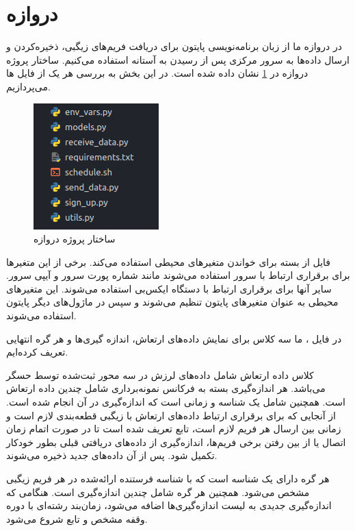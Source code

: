 \section{دروازه}

در دروازه ما از زبان برنامه‌نویسی پایتون برای دریافت فریم‌های زیگبی، ذخیره‌کردن و ارسال داده‌ها به سرور مرکزی پس از رسیدن به آستانه استفاده می‌کنیم. ساختار پروژه دروازه در \cref{fig:gateway_structure} نشان داده شده است. در این بخش به بررسی هر یک از فایل ها می‌پردازیم.


\begin{figure}[!h]
\centering\includegraphics[scale=1]{gateway_structure.png}
\caption{ساختار پروژه دروازه}\label{fig:gateway_structure}
\end{figure}

فایل  از بسته  برای خواندن متغیرهای محیطی استفاده می‌کند. برخی از این متغیرها برای برقراری ارتباط با سرور استفاده می‌شوند مانند شماره پورت سرور و آیپی سرور. سایر آنها برای برقراری ارتباط با دستگاه ایکس‌بی استفاده می‌شوند. این متغیرهای محیطی به عنوان متغیرهای پایتون تنظیم می‌شوند و سپس در ماژول‌های دیگر پایتون استفاده می‌شوند.


در فایل ، ما سه کلاس برای نمایش داده‌های ارتعاش، اندازه گیری‌ها و هر گره انتهایی تعریف کرده‌ایم.

کلاس داده ارتعاش شامل داده‌های لرزش در سه محور ثبت‌شده توسط حسگر می‌باشد. هر اندازه‌گیری بسته به فرکانس نمونه‌برداری شامل چندین داده ارتعاش است. همچنین شامل یک شناسه و زمانی است که اندازه‌گیری در آن انجام شده است. از آنجایی که برای برقراری ارتباط داده‌های ارتعاش با زیگبی قطعه‌بندی لازم است و زمانی بین ارسال هر فریم لازم است، تابع  تعریف شده است تا در صورت اتمام زمان اتصال یا از بین رفتن برخی فریم‌ها، اندازه‌گیری از داده‌های دریافتی قبلی بطور خودکار تکمیل شود. پس از آن داده‌های جدید ذخیره می‌شوند.

هر گره دارای یک شناسه است که با شناسه فرستنده ارائه‌شده در هر فریم زیگبی مشخص می‌شود. همچنین هر گره شامل چندین اندازه‌گیری است. هنگامی که اندازه‌گیری جدیدی به لیست اندازه‌گیری‌ها اضافه می‌شود، زمان‌بند رشته‌ای با دوره وقفه مشخص و تابع  شروع می‌شود.


